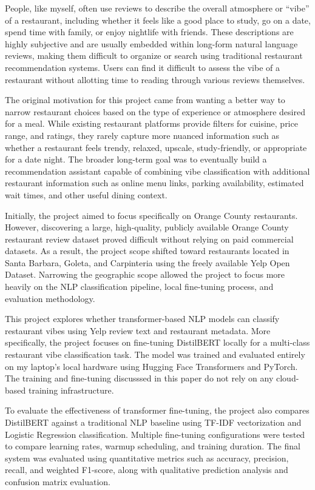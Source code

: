 \documentclass[11pt]{article}
\begin{document}
People, like myself, often use reviews to describe the overall atmosphere or “vibe” of a restaurant, including whether 
it feels like a good place to study, go on a date, spend time with family, or enjoy nightlife with friends. These 
descriptions are highly subjective and are usually embedded within long-form natural language reviews, making them 
difficult to organize or search using traditional restaurant recommendation systems. Users can find it difficult to 
assess the vibe of a restaurant without allotting time to reading through various reviews themselves.

\medbreak The original motivation for this project came from wanting a better way to narrow restaurant choices based on the type 
of experience or atmosphere desired for a meal. While existing restaurant platforms provide filters for cuisine, 
price range, and ratings, they rarely capture more nuanced information such as whether a restaurant feels trendy, 
relaxed, upscale, study-friendly, or appropriate for a date night. The broader long-term goal was to eventually 
build a recommendation assistant capable of combining vibe classification with additional restaurant information 
such as online menu links, parking availability, estimated wait times, and other useful dining context.

\medbreak \noindent Initially, the project aimed to focus specifically on Orange County restaurants. However, discovering a large, 
high-quality, publicly available Orange County restaurant review dataset proved difficult without relying on paid 
commercial datasets. As a result, the project scope shifted toward restaurants located in Santa Barbara, Goleta, and 
Carpinteria using the freely available Yelp Open Dataset. Narrowing the geographic scope allowed the project to focus 
more heavily on the NLP classification pipeline, local fine-tuning process, and evaluation methodology.

\medbreak This project explores whether transformer-based NLP models can classify restaurant vibes using Yelp review text and 
restaurant metadata. More specifically, the project focuses on fine-tuning DistilBERT locally for a multi-class 
restaurant vibe classification task. The model was trained and evaluated entirely on my laptop's local hardware 
using Hugging Face Transformers and PyTorch. The training and fine-tuning discusssed in this paper do not rely on 
any cloud-based training infrastructure.

\medbreak \noindent To evaluate the effectiveness of transformer fine-tuning, the project also compares DistilBERT against a traditional 
NLP baseline using TF-IDF vectorization and Logistic Regression classification. Multiple fine-tuning configurations 
were tested to compare learning rates, warmup scheduling, and training duration. The final system was evaluated using 
quantitative metrics such as accuracy, precision, recall, and weighted F1-score, along with qualitative prediction 
analysis and confusion matrix evaluation.
\end{document}
